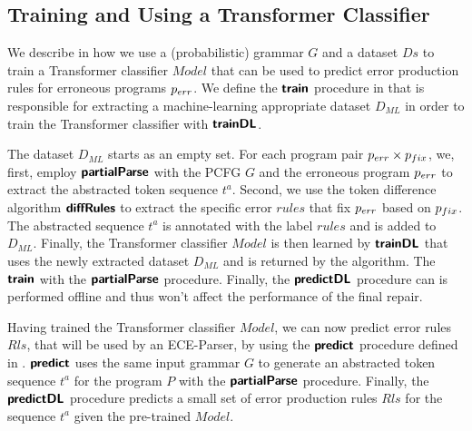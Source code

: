 \subsection{Training and Using a Transformer Classifier}
\label{sec:whole-system:training-classifier}

\begin{figure}[t]
  \centering
  \begin{minipage}[t]{0.49\linewidth}
    \centering
    
  \end{minipage}
  \hspace{0.02\linewidth}
  \begin{minipage}[t]{0.47\linewidth}
    \centering
    
  \end{minipage}
\end{figure}

%
We describe in  how we use a
(probabilistic) grammar $G$ and a dataset $Ds$ to train a Transformer classifier
$Model$ that can be used to predict error production rules for erroneous
programs $p_{err}$. We define the $\bm{\mathsf{train}}$ procedure in
 that is responsible for extracting a
machine-learning appropriate dataset $D_{ML}$ in order to train the Transformer
classifier with $\bm{\mathsf{trainDL}}$.

The dataset $D_{ML}$ starts as an empty set. For each program pair $p_{err} \times
p_{fix}$, we, first, employ $\bm{\mathsf{partialParse}}$ with the PCFG $G$ and the erroneous
program $p_{err}$ to extract the abstracted token sequence $t^a$. Second, we use
the token difference algorithm $\bm{\mathsf{diffRules}}$ to extract the specific error $rules$
that fix $p_{err}$ based on $p_{fix}$. The abstracted sequence $t^a$ is annotated
with the label $rules$ and is added to $D_{ML}$. Finally, the Transformer
classifier $Model$ is then learned by $\bm{\mathsf{trainDL}}$ that uses the newly
extracted dataset $D_{ML}$ and is returned by the algorithm. The $\bm{\mathsf{train}}$
with the $\bm{\mathsf{partialParse}}$ procedure. Finally, the $\bm{\mathsf{predictDL}}$ procedure can is
performed offline and thus won't affect the performance of the final repair.

%
Having trained the Transformer classifier $Model$, we can now predict error
rules $Rls$, that will be used by an ECE-Parser, by using the $\bm{\mathsf{predict}}$
procedure defined in . $\bm{\mathsf{predict}}$ uses the same input
grammar $G$ to generate an abstracted token sequence $t^a$ for the program $P$
with the $\bm{\mathsf{partialParse}}$ procedure. Finally, the $\bm{\mathsf{predictDL}}$ procedure
predicts a small set of error production rules $Rls$ for the sequence $t^a$
given the pre-trained $Model$.


